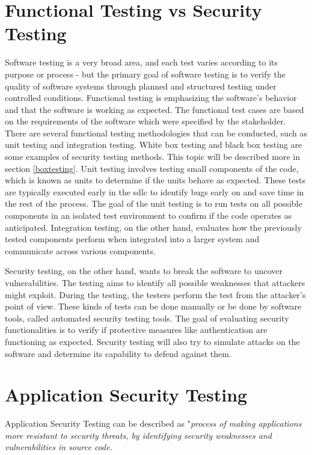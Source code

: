 \section{Functional Testing vs Security Testing}
Software testing is a very broad area, and each test varies according to its purpose or process - but the primary goal of software testing is to verify the quality of software systems through planned and structured testing under controlled conditions. Functional testing is emphasizing the software's behavior and that the software is working as expected. The functional test cases are based on the requirements of the software which were specified by the stakeholder. There are several functional testing methodologies that can be conducted, such as unit testing and integration testing. White box testing and black box testing are some examples of security testing methods. This topic will be described more in section  \ref{boxtesting}. 
\cite{difftesting} 
Unit testing involves testing small components of the code, which is known as units to determine if the units behave as expected. These tests are typically executed early in the \acrshort{sdlc} to identify bugs early on and save time in the rest of the process. The goal of the unit testing is to run tests on all possible components in an isolated test environment to confirm if the code operates as anticipated. Integration testing, on the other hand, evaluates how the previously tested components perform when integrated into a larger system and communicate across various components. 
\cite{unitvsintergration}

Security testing, on the other hand, wants to break the software to uncover vulnerabilities. The testing aims to identify all possible weaknesses that attackers might exploit. During the testing, the testers perform the test from the attacker's point of view. These kinds of tests can be done manually or be done by software tools, called automated security testing tools. The goal of evaluating security functionalities is to verify if protective measures like authentication are functioning as expected. Security testing will also try to simulate attacks on the software and determine its capability to defend against them.\cite{whysectest}





\section{Application Security Testing}
Application Security Testing can be described as "\textit{process of making applications more resistant to security threats, by identifying security weaknesses and vulnerabilities in source code.}\cite{AST}

